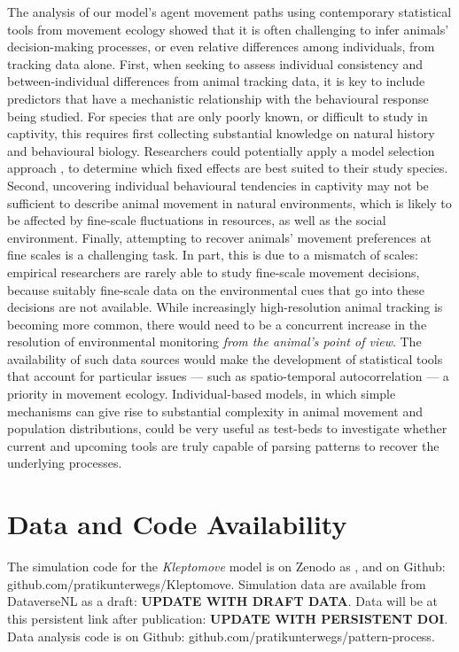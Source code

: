     The analysis of our model's agent movement paths using contemporary statistical tools from movement ecology showed that it is often challenging to infer animals' decision-making processes, or even relative differences among individuals, from tracking data alone.
    First, when seeking to assess individual consistency and between-individual differences from animal tracking data, it is key to include predictors that have a mechanistic relationship with the behavioural response being studied.
    For species that are only poorly known, or difficult to study in captivity, this requires first collecting substantial knowledge on natural history and behavioural biology.
    Researchers could potentially apply a model selection approach \citep{burnham2011}, to determine which fixed effects are best suited to their study species.
    Second, uncovering individual behavioural tendencies in captivity may not be sufficient to describe animal movement in natural environments, which is likely to be affected by fine-scale fluctuations in resources, as well as the social environment.
    Finally, attempting to recover animals' movement preferences at fine scales is a challenging task.
    In part, this is due to a mismatch of scales: empirical researchers are rarely able to study fine-scale movement decisions, because suitably fine-scale data on the environmental cues that go into these decisions are not available.
    While increasingly high-resolution animal tracking is becoming more common, there would need to be a concurrent increase in the resolution of environmental monitoring \textit{from the animal's point of view}.
    The availability of such data sources would make the development of statistical tools that account for particular issues --- such as spatio-temporal autocorrelation --- a priority in movement ecology.
    Individual-based models, in which simple mechanisms can give rise to substantial complexity in animal movement and population distributions, could be very useful as test-beds to investigate whether current and upcoming tools are truly capable of parsing patterns to recover the underlying processes.
    
    \section*{Data and Code Availability}
    
    The simulation code for the \textit{Kleptomove} model is on Zenodo as \citealt[(zenodo.org/record/4905476)]{netz2022a}, and on Github: github.com/pratikunterwegs/Kleptomove.
    Simulation data are available from DataverseNL as a draft: \textbf{UPDATE WITH DRAFT DATA}.
    Data will be at this persistent link after publication: \textbf{UPDATE WITH PERSISTENT DOI}.
    Data analysis code is on Github: github.com/pratikunterwegs/pattern-process.
    

